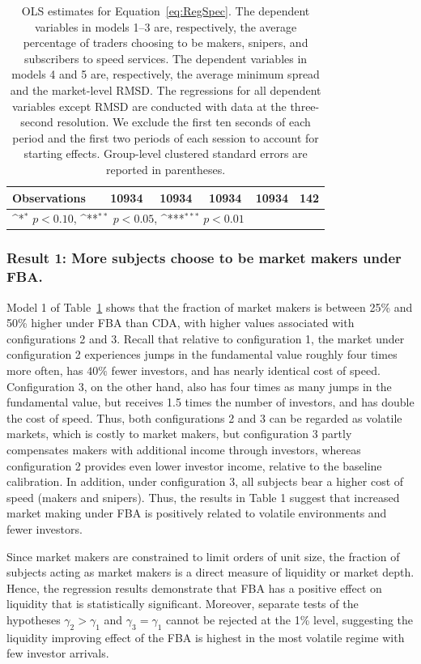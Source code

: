 \documentclass[12pt]{article}
\def\sym#1{\ifmmode^{#1}\else\(^{#1}\)\fi}
\begin{document}
\begin{table}
\begin{tabular}{l*{5}{c}}
\midrule
Observations        &       10934         &       10934         &       10934         &       10934         &         142         \\
\bottomrule
\multicolumn{4}{l}{\footnotesize \sym{*} \(p<0.10\), \sym{**} \(p<0.05\), \sym{***} \(p<0.01\)}\\
\end{tabular}
\caption{\label{tab:Regressions} {\small OLS estimates for Equation~\eqref{eq:RegSpec}. The dependent variables in models 1--3 are, respectively, the average percentage of traders choosing to be makers,  snipers, and subscribers to speed services. The dependent variables in models 4 and 5 are, respectively, the average minimum spread and the market-level RMSD. The regressions for all dependent variables except RMSD are conducted with data at the three-second resolution. We exclude the first ten seconds of each period and the first two periods of each session to account for starting effects. Group-level clustered standard errors are reported in parentheses.}}
\end{table}

\subsubsection*{Result 1: More subjects choose to be market makers under FBA.}
Model 1 of Table~\ref{tab:Regressions} shows that the fraction of market makers is between 25\% and 50\% higher under FBA than CDA, with higher values associated with configurations 2 and 3.
Recall that relative to configuration 1, the market under configuration 2 experiences jumps in the fundamental value roughly four times more often, has $40\%$ fewer investors, and has nearly identical cost of speed. Configuration 3, on the other hand, also has four times as many jumps in the fundamental value, but receives 1.5 times the number of investors, and has double the cost of speed. Thus, both configurations 2 and 3 can be regarded as volatile markets, which is costly to market makers, but configuration 3 partly compensates makers with additional income through investors, whereas configuration 2 provides even lower investor income, relative to the baseline calibration. In addition, under configuration 3, all subjects bear a higher cost of speed (makers and snipers). Thus, the results in Table 1 suggest that increased market making under FBA is positively related to volatile environments and fewer investors.

Since market makers are constrained to limit orders of unit size, the fraction of subjects acting as market makers is a direct measure of liquidity or market depth. Hence, the regression results demonstrate that FBA has a positive effect on liquidity that is statistically significant. Moreover, separate tests of the hypotheses $\gamma_2 > \gamma_1$ and  $\gamma_3=\gamma_1$ cannot be rejected at the 1\% level, suggesting the liquidity improving effect of the FBA is highest in the most volatile regime with few investor arrivals.
\end{document}
